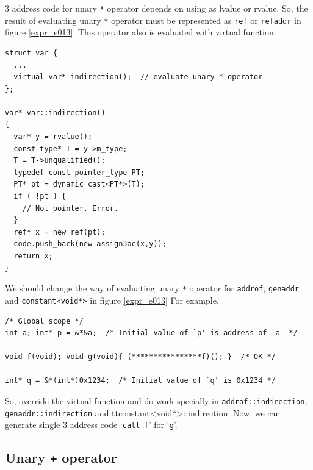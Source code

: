 3 address code for unary {\tt{*}} operator depends on
using as lvalue or rvalue. So, the result of evaluating unary
{\tt{*}} operator must be represented as
{\tt{ref}} or {\tt{refaddr}} in figure \ref{expr_e013}.
This operator also is evaluated with virtual function.
\begin{verbatim}
struct var {
  ...
  virtual var* indirection();  // evaluate unary * operator
};

var* var::indirection()
{
  var* y = rvalue();
  const type* T = y->m_type;
  T = T->unqualified();
  typedef const pointer_type PT;
  PT* pt = dynamic_cast<PT*>(T);
  if ( !pt ) {
    // Not pointer. Error.
  }
  ref* x = new ref(pt);
  code.push_back(new assign3ac(x,y));
  return x;
}
\end{verbatim}
We should change the way of evaluating unary {\tt{*}} operator
for {\tt{addrof}}, {\tt{genaddr}} and {\tt{constant<void*>}}
in figure \ref{expr_e013}
For example,
\begin{verbatim}
/* Global scope */
int a; int* p = &*&a;  /* Initial value of `p' is address of `a' */

void f(void); void g(void){ (****************f)(); }  /* OK */

int* q = &*(int*)0x1234;  /* Initial value of `q' is 0x1234 */
\end{verbatim}
So, override the virtual function and do work specially
in {\tt{addrof::indirection}}, {\tt{genaddr::indirection}} and
{tt{constant<void*>::indirection}}.
Now, we can generate single 3 address code `{\tt{call f}}' for `{\tt{g}}'.

\subsection{Unary {\tt{+}} operator}


